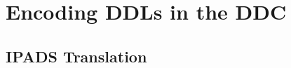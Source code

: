 \section{Encoding DDLs in the DDC}
\label{sec:encodings}

\subsection{IPADS Translation}
\label{sec:trans-sl}



